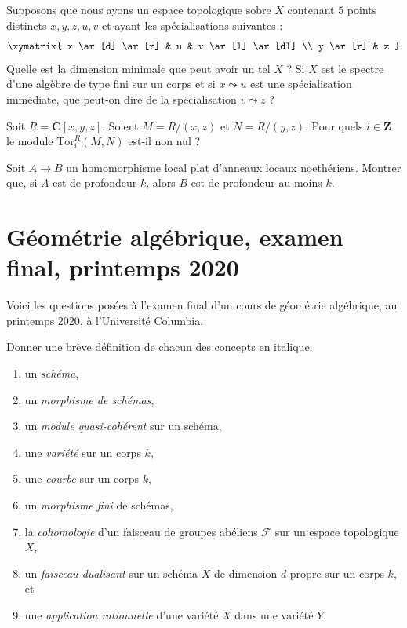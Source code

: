 \begin{exercise}[Dimension]
\label{exercise-dimension}
Supposons que nous ayons un espace topologique sobre $X$ contenant $5$ points distincts
$x, y, z, u, v$ et ayant les spécialisations suivantes :
$$
\xymatrix{
x \ar[d] \ar[r] & u & v \ar[l] \ar[dl] \\
y \ar[r] & z
}
$$
Quelle est la dimension minimale que peut avoir un tel $X$ ? Si $X$ est le spectre
d'une algèbre de type fini sur un corps et si $x \leadsto u$ est une
spécialisation immédiate, que peut-on dire de la
spécialisation $v \leadsto z$ ?
\end{exercise}

\begin{exercise}
\label{exercise-tor-computation}
Soit $R = \mathbf{C}[x, y, z]$. Soient $M = R/(x, z)$ et $N = R/(y, z)$.
Pour quels $i \in \mathbf{Z}$ le module $\text{Tor}_i^R(M, N)$ est-il non nul ?
\end{exercise}

\begin{exercise}
\label{exercise-depth-goes-up}
Soit $A \to B$ un homomorphisme local plat d'anneaux locaux noethériens.
Montrer que, si $A$ est de profondeur $k$, alors $B$ est de profondeur au moins $k$.
\end{exercise}









\section{Géométrie algébrique, examen final, printemps 2020}
\label{section-final-exam-spring-2020}

\noindent
Voici les questions posées à l'examen final d'un cours de géométrie algébrique,
au printemps 2020, à l'Université Columbia.

\begin{exercise}[Définitions]
\label{exercise-definitions-spring-2020}
Donner une brève définition de chacun des concepts en italique.
\begin{enumerate}
\item un {\it schéma},
\item un {\it morphisme de schémas},
\item un {\it module quasi-cohérent} sur un schéma,
\item une {\it variété} sur un corps $k$,
\item une {\it courbe} sur un corps $k$,
\item un {\it morphisme fini} de schémas,
\item la {\it cohomologie} d'un faisceau de groupes abéliens $\mathcal{F}$
sur un espace topologique $X$,
\item un {\it faisceau dualisant} sur un schéma $X$ de dimension $d$
propre sur un corps $k$, et
\item une {\it application rationnelle} d'une variété $X$ dans une variété $Y$.
\end{enumerate}
\end{exercise}

